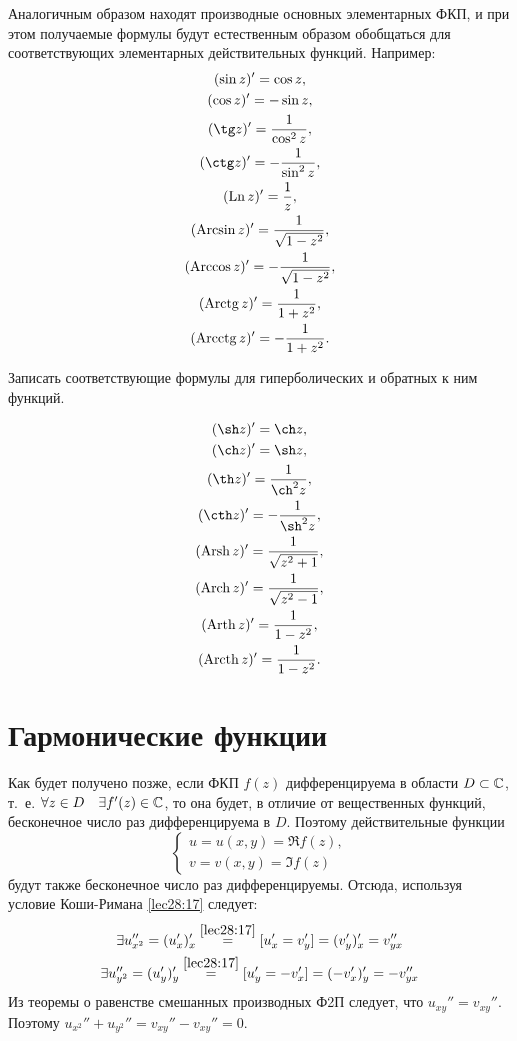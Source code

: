 \documentclass[../../main.tex]{subfiles}
\begin{document}
Аналогичным образом находят производные основных элементарных ФКП, 
и при этом получаемые формулы будут естественным образом обобщаться для
соответствующих элементарных действительных функций. Например:
\[
\begin{gathered}
(\sin z)' = \cos z,\\ (\cos z)' = -\sin z,\\
(\tg z)' = \dfrac{1}{\cos^2 z},\\ 
(\ctg z)' = -\dfrac{1}{\sin^2 z},\\
(\Ln z)' = \dfrac{1}{z},\\
(\Arcsin z)' = \dfrac{1}{\sqrt{1 - z^2}},\\
(\Arccos z)' = -\dfrac{1}{\sqrt{1 - z^2}},\\
(\Arctg z)' = \dfrac{1}{1 + z^2},\\
(\Arcctg z)' = -\dfrac{1}{1 + z^2}.
\end{gathered}
\]
\begin{exc}
	Записать соответствующие формулы для гиперболических 
	и обратных к ним функций.
\end{exc}
\begin{eans}
\begin{gather*}
(\sh z)' = \ch z,\\
(\ch z)' = \sh z,\\
(\th z)' = \dfrac{1}{\ch^2 z},\\
(\cth z)' = -\dfrac{1}{\sh^2 z},\\
(\Arsh z)' = \dfrac{1}{\sqrt{z^2 + 1}},\\
(\Arch z)' = \dfrac{1}{\sqrt{z^2 - 1}},\\
(\Arth z)' = \dfrac{1}{1 - z^2},\\
(\Arcth z)' = \dfrac{1}{1 - z^2}.
\end{gather*}
\end{eans}

\section{Гармонические функции}

Как будет получено позже, если ФКП $ f(z) $ дифференцируема в области
$ D \subset \mathbb{C} $, т.~е. $ \forall z \in D \quad\exists f'(z) \in \mathbb{C} $, то она 
будет,
в отличие от вещественных функций, бесконечное число раз дифференцируема в 
$D$. Поэтому действительные функции 
\[
\begin{cases}
	u = u(x, y) = \Re f(z),\\
	v = v(x, y) = \Im f(z)
\end{cases}
\]
будут также бесконечное число раз дифференцируемы. Отсюда, используя условие
Коши-Римана \eqref{lec28:17} следует:
\[
\begin{gathered}
\exists u_{x^2}'' = (u_x')_x' 
\stackrel{\eqref{lec28:17}}{=}
[u_x' = v_y'] = (v_y')_x' = v_{yx}''\\
\exists u_{y^2}'' = (u_y')_y' 
\stackrel{\eqref{lec28:17}}{=}
[u_y' = -v_x'] = (-v_x')_y' = -v_{yx}''\\
\end{gathered}
\]
Из теоремы о равенстве смешанных производных Ф2П следует, что 
$ u_{xy}'' = v_{xy}'' $. Поэтому $ u_{x^2}'' + u_{y^2}'' = v_{xy}'' - 
v_{xy}'' = 0 $.
\end{document}

